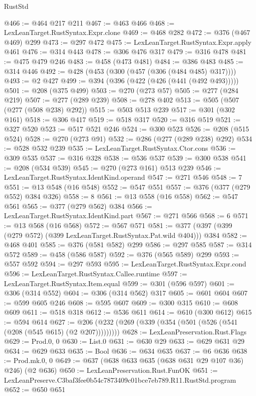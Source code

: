 \begin{lexlean}{RustStd}
\begin{coremodule}
@466 := @464 @217 @211
@467 := @463 @466
@468 := LexLeanTarget.RustSyntax.Expr.clone
@469 := @468 @282
@472 := @376 (@467 @469) @299
@473 := @297 @472
@475 := LexLeanTarget.RustSyntax.Expr.apply @461
@476 := @314 @443
@478 := @306 @476 @317
@479 := @316 @478
@481 := @475 @479 @246
@483 := @458 (@473 @481)
@484 := @386 @483
@485 := @314 @446
@492 := @428 (@453 (@300 (@457 (@306 (@484 @485) @317))))
@493 := @2 @427
@499 := @394 (@396 (@422 (@426 (@441 (@492 @493)))))
@501 := @208 (@375 @499)
@503 := @270 (@273 @57)
@505 := @277 (@284 @219)
@507 := @277 (@289 @239)
@508 := @278 @402
@513 := @505 (@507 (@277 (@508 @238) @292))
@515 := @503 @513 @239
@517 := @301 (@302 @161)
@518 := @306 @417
@519 := @518 @317
@520 := @316 @519
@521 := @327 @520
@523 := @517 @521 @246
@524 := @300 @523
@526 := @208 (@515 @524)
@528 := @270 (@273 @91)
@532 := @286 (@277 (@289 @238) @292)
@534 := @528 @532 @239
@535 := LexLeanTarget.RustSyntax.Ctor.cons
@536 := @309 @535
@537 := @316 @328
@538 := @536 @537
@539 := @300 @538
@541 := @208 (@534 @539)
@545 := @270 (@273 @161) @513 @239
@546 := LexLeanTarget.RustSyntax.IdentKind.operand
@547 := @271 @546
@548 := 7
@551 := @13 @548 (@16 @548)
@552 := @547 @551
@557 := @376 (@377 (@279 @552) @384 @326)
@558 := 8
@561 := @13 @558 (@16 @558)
@562 := @547 @561
@565 := @377 (@279 @562) @384
@566 := LexLeanTarget.RustSyntax.IdentKind.part
@567 := @271 @566
@568 := 6
@571 := @13 @568 (@16 @568)
@572 := @567 @571
@581 := @377 (@397 (@399 (@279 @572) (@399 LexLeanTarget.RustSyntax.Pat.wild @404))) @384
@582 := @468 @401
@585 := @376 (@581 @582) @299
@586 := @297 @585
@587 := @314 @572
@589 := @458 (@586 @587)
@592 := @376 (@565 @589) @299
@593 := @557 @592
@594 := @297 @593
@595 := LexLeanTarget.RustSyntax.Expr.cond
@596 := LexLeanTarget.RustSyntax.Callee.runtime
@597 := LexLeanTarget.RustSyntax.Item.equal
@599 := @301 (@596 @597)
@601 := @306 (@314 @552)
@604 := @306 (@314 @562) @317
@605 := @601 @604
@607 := @599 @605 @246
@608 := @595 @607
@609 := @300 @315
@610 := @608 @609
@611 := @518 @318
@612 := @536 @611
@614 := @610 (@300 @612)
@615 := @594 @614
@627 := @206 (@232 (@269 (@339 (@354 (@501 (@526 (@541 (@208 (@545 @615) (@2 @207)))))))))
@628 := LexLeanPreservation.Rust.Flags
@629 := Prod.{0, 0}
@630 := List.{0}
@631 := @630 @29
@633 := @629 @631 @29
@634 := @629 @633
@635 := Bool
@636 := @634 @635
@637 := @6 @636
@638 := Prod.mk.{0, 0}
@649 := @637 (@638 @633 @635 (@638 @631 @29 @107 @36) @246) (@2 @636)
@650 := LexLeanPreservation.Rust.FunOK
@651 := LexLeanPreserve.C3baf3fee0b54c7873409c01bce7eb789.R11.RustStd.program
@652 := @650 @651

\end{coremodule}
\end{lexlean}
